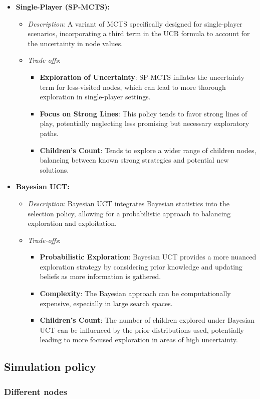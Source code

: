 \begin{itemize}
    \item \textbf{Single-Player (SP-MCTS):}
          \begin{itemize}
              \item \textit{Description}: A variant of MCTS specifically designed for single-player scenarios, incorporating a third term in the UCB formula to account for the uncertainty in node values.
              \item \textit{Trade-offs}:
                    \begin{itemize}
                        \item \textbf{Exploration of Uncertainty}: SP-MCTS inflates the uncertainty term for less-visited nodes, which can lead to more thorough exploration in single-player settings.
                        \item \textbf{Focus on Strong Lines}: This policy tends to favor strong lines of play, potentially neglecting less promising but necessary exploratory paths.
                        \item \textbf{Children's Count}: Tends to explore a wider range of children nodes, balancing between known strong strategies and potential new solutions.
                    \end{itemize}
          \end{itemize}

    \item \textbf{Bayesian UCT:}
          \begin{itemize}
              \item \textit{Description}: Bayesian UCT integrates Bayesian statistics into the selection policy, allowing for a probabilistic approach to balancing exploration and exploitation.
              \item \textit{Trade-offs}:
                    \begin{itemize}
                        \item \textbf{Probabilistic Exploration}: Bayesian UCT provides a more nuanced exploration strategy by considering prior knowledge and updating beliefs as more information is gathered.
                        \item \textbf{Complexity}: The Bayesian approach can be computationally expensive, especially in large search spaces.
                        \item \textbf{Children's Count}: The number of children explored under Bayesian UCT can be influenced by the prior distributions used, potentially leading to more focused exploration in areas of high uncertainty.
                    \end{itemize}
          \end{itemize}
\end{itemize}

\subsection{Simulation policy}

\subsubsection{Different nodes}